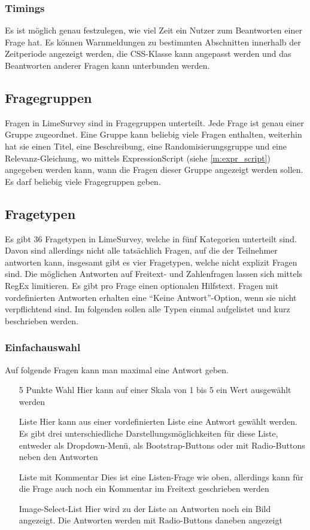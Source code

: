 \subsubsection{Timings}

Es ist möglich genau festzulegen, wie viel Zeit ein Nutzer zum Beantworten einer Frage hat.
Es können Warnmeldungen zu bestimmten Abschnitten innerhalb der Zeitperiode angezeigt werden, die CSS-Klasse kann angepasst werden und das Beantworten anderer Fragen kann unterbunden werden.

\subsection{Fragegruppen}

Fragen in LimeSurvey sind in Fragegruppen unterteilt. Jede Frage ist genau einer Gruppe zugeordnet.
Eine Gruppe kann beliebig viele Fragen enthalten, weiterhin hat sie einen Titel, eine Beschreibung, eine Randomisierungsgruppe und eine Relevanz-Gleichung, wo mittels ExpressionScript (siehe \cref{m:expr_script}) angegeben werden kann, wann die Fragen dieser Gruppe angezeigt werden sollen.
Es darf beliebig viele Fragegruppen geben.

\subsection{Fragetypen}

Es gibt 36 Fragetypen in LimeSurvey, welche in fünf Kategorien unterteilt sind.
Davon sind allerdings nicht alle tatsächlich Fragen, auf die der Teilnehmer antworten kann, insgesamt gibt es vier Fragetypen, welche nicht explizit Fragen sind. %
Die möglichen Antworten auf Freitext- und Zahlenfragen lassen sich mittels RegEx limitieren.
Es gibt pro Frage einen optionalen Hilfstext.
Fragen mit vordefinierten Antworten erhalten eine \enquote{Keine Antwort}-Option, wenn sie nicht verpflichtend sind.
Im folgenden sollen alle Typen einmal aufgelistet und kurz beschrieben werden.


\subsubsection{Einfachauswahl}

Auf folgende Fragen kann man maximal eine Antwort geben.
\begin{itemize}
	\item[5 Punkte Wahl] Hier kann auf einer Skala von 1 bis 5 ein Wert ausgewählt werden
	\item[Liste] Hier kann aus einer vordefinierten Liste eine Antwort gewählt werden. Es gibt drei unterschiedliche Darstellungsmöglichkeiten für diese Liste, entweder als Dropdown-Menü, als Bootstrap-Buttons oder mit Radio-Buttons neben den Antworten
	\item[Liste mit Kommentar] Dies ist eine Listen-Frage wie oben, allerdings kann für die Frage auch noch ein Kommentar im Freitext geschrieben werden
	\item[Image-Select-List] Hier wird zu der Liste an Antworten noch ein Bild angezeigt. Die Antworten werden mit Radio-Buttons daneben angezeigt
\end{itemize}

